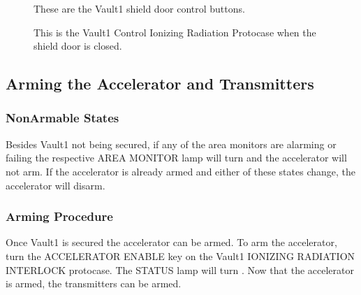 \documentclass[letterpaper,10pt,english]{sphinxmanual}
\begin{document}
\begin{figure}[htbp]
\centering
\capstart

\noindent{}
\caption{ These are the Vault\sphinxhyphen{}1 shield door control buttons.}\label{\detokenize{user_documentation/Vault-1_ionizing_radiation:id4}}\end{figure}

\begin{figure}[htbp]
\centering
\capstart

\noindent{}
\caption{ This is the Vault\sphinxhyphen{}1 Control Ionizing Radiation Protocase when the shield door is closed.}\label{\detokenize{user_documentation/Vault-1_ionizing_radiation:id5}}\end{figure}


\subsection{Arming the Accelerator and Transmitters}
\label{\detokenize{user_documentation/Vault-1_ionizing_radiation:arming-the-accelerator-and-transmitters}}

\subsubsection{Non\sphinxhyphen{}Armable States}
\label{\detokenize{user_documentation/Vault-1_ionizing_radiation:non-armable-states}}
\sphinxAtStartPar
Besides Vault\sphinxhyphen{}1 not being secured, if any of the area monitors are alarming or failing the respective AREA MONITOR lamp will turn  and the accelerator will not arm.
If the accelerator is already armed and either of these states change, the accelerator will disarm.


\subsubsection{Arming Procedure}
\label{\detokenize{user_documentation/Vault-1_ionizing_radiation:arming-procedure}}
\sphinxAtStartPar
Once Vault\sphinxhyphen{}1 is secured the accelerator can be armed.
To arm the accelerator, turn the ACCELERATOR ENABLE key on the Vault\sphinxhyphen{}1 IONIZING RADIATION INTERLOCK protocase.
The STATUS lamp will turn . Now that the accelerator is armed, the transmitters can be armed.
\end{document}
